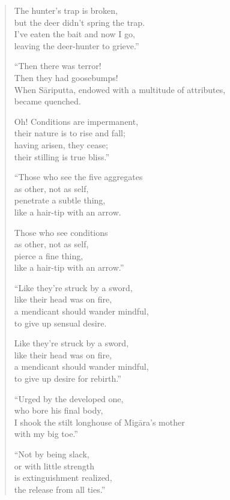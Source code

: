 \documentclass[12pt,openany]{book}%
\begin{document}
\begin{verse}
The hunter’s trap is broken, \\
but the deer didn’t spring the trap. \\
I’ve eaten the bait and now I go, \\
leaving the deer-hunter to grieve.” 

“Then there was terror! \\
Then they had goosebumps! \\
When \textsanskrit{Sāriputta}, endowed with a multitude of attributes, \\
became quenched. 

Oh! Conditions are impermanent, \\
their nature is to rise and fall; \\
having arisen, they cease; \\
their stilling is true bliss.” 

“Those who see the five aggregates \\
as other, not as self, \\
penetrate a subtle thing, \\
like a hair-tip with an arrow. 

Those who see conditions \\
as other, not as self, \\
pierce a fine thing, \\
like a hair-tip with an arrow.” 

“Like they’re struck by a sword, \\
like their head was on fire, \\
a mendicant should wander mindful, \\
to give up sensual desire. 

Like they’re struck by a sword, \\
like their head was on fire, \\
a mendicant should wander mindful, \\
to give up desire for rebirth.” 

“Urged by the developed one, \\
who bore his final body, \\
I shook the stilt longhouse of \textsanskrit{Migāra}’s mother \\
with my big toe.” 

“Not by being slack, \\
or with little strength \\
is extinguishment realized, \\
the release from all ties.” 


\end{verse}
\end{document}
